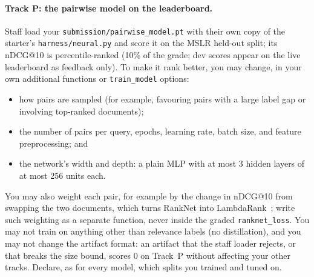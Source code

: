 \documentclass[10pt]{article}
\begin{document}
\paragraph{Track P: the pairwise model on the leaderboard.}
Staff load your \texttt{submission/pairwise\_model.pt} with their own copy of the starter's \texttt{harness/neural.py} and score it on the MSLR held-out split; its nDCG@10 is percentile-ranked (10\% of the grade; dev scores appear on the live leaderboard as feedback only). To make it rank better, you may change, in your own additional functions or \texttt{train\_model} options:
\begin{itemize}
  \item how pairs are sampled (for example, favouring pairs with a large label gap or involving top-ranked documents);
  \item the number of pairs per query, epochs, learning rate, batch size, and feature preprocessing; and
  \item the network's width and depth: a plain MLP with at most 3 hidden layers of at most 256 units each.
\end{itemize}
You may also weight each pair, for example by the change in nDCG@10 from swapping the two documents, which turns RankNet into LambdaRank~\cite{burges2010}; write such weighting as a separate function, never inside the graded \texttt{ranknet\_loss}. You may not train on anything other than relevance labels (no distillation), and you may not change the artifact format: an artifact that the staff loader rejects, or that breaks the size bound, scores 0 on Track~P without affecting your other tracks. Declare, as for every model, which splits you trained and tuned on.
\end{document}
